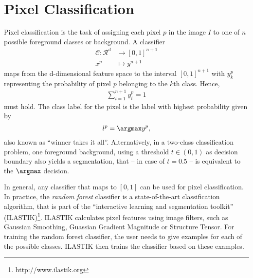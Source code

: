 \section{Pixel Classification}
\label{sec:pixel-classification}

Pixel classification is the task of assigning each pixel $p$ in the image $I$ to one of $n$ possible foreground
classes or background. A classifier
\begin{align}
    \mathcal{C}\colon \mathcal{R}^d &\to [0,1]^{n+1} \\
    x^p &\mapsto y^{n+1}    
\end{align}
maps from the d-dimensional feature space to the interval $[0,1]^{n+1}$ with $y_k^p$ representing the
probability of pixel $p$ belonging to the $k$th class. Hence,
\begin{align}
    \sum_{i=1}^{n+1}y_i^p = 1
\end{align}
must hold. The class label for the pixel is the label with highest probability given by
\begin{align}
    l^p = \argmax y^p, 
\end{align}
also known as ``winner takes it all''. Alternatively, in a two-class classification problem, \ie one
foreground \vs background, using a threshold $t \in (0,1)$ as decision boundary also yields a
segmentation, that -- in case of $t=0.5$ -- is equivalent to the $\argmax$ decision.

In general, any classifier that maps to $[0,1]$ can be used for pixel classification. In practice,
the \emph{random forest} classifier is a state-of-the-art classification algorithm, that is part of
the ``interactive learning and segmentation toolkit''
(ILASTIK)\footnote{http://www.ilastik.org}. ILASTIK calculates pixel features using image filters,
such as Gaussian Smoothing, Guassian Gradient Magnitude or Structure Tensor.
For training the random forest classifier, the user needs to give examples for each of the possible
classes. ILASTIK then trains the classifier based on these examples.

